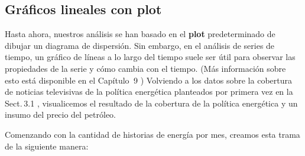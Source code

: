 \documentclass[
]{book}
\newenvironment{Shaded}{\begin{snugshade}}{\end{snugshade}}
\newcommand{\AttributeTok}[1]{\textcolor[rgb]{0.77,0.63,0.00}{#1}}
\newcommand{\DecValTok}[1]{\textcolor[rgb]{0.00,0.00,0.81}{#1}}
\newcommand{\FunctionTok}[1]{\textcolor[rgb]{0.00,0.00,0.00}{#1}}
\newcommand{\NormalTok}[1]{#1}
\newcommand{\SpecialCharTok}[1]{\textcolor[rgb]{0.00,0.00,0.00}{#1}}
\newcommand{\StringTok}[1]{\textcolor[rgb]{0.31,0.60,0.02}{#1}}
\begin{document}
\hypertarget{gruxe1ficos-lineales-con-plot}{%
\subsection*{\texorpdfstring{Gráficos lineales con \textbf{plot}}{Gráficos lineales con plot}}\label{gruxe1ficos-lineales-con-plot}}

Hasta ahora, nuestros análisis se han basado en el \textbf{plot} predeterminado de dibujar un diagrama de dispersión. Sin embargo, en el análisis de series de tiempo, un gráfico de líneas a lo largo del tiempo suele ser útil para observar las propiedades de la serie y cómo cambia con el tiempo. (Más información sobre esto está disponible en el Capítulo  9 ) Volviendo a los datos sobre la cobertura de noticias televisivas de la política energética planteados por primera vez en la Sect. 3.1 , visualicemos el resultado de la cobertura de la política energética y un insumo del precio del petróleo.

Comenzando con la cantidad de historias de energía por mes, creamos esta trama de la siguiente manera:

\begin{Shaded}
\end{Shaded}
\end{document}
